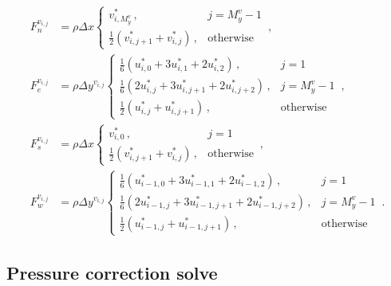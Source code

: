 \documentclass{article}
\begin{document}
\begin{subequations}
	\begin{align}
	F_n^{v_{i,j}} & = \rho \Delta x \begin{cases}
	v^*_{i, M_y^v}\,, & j = M_y^v - 1 \\
	\frac{1}{2} \left(v^*_{i, j+1} + v^*_{i,j}\right)\,, & \text{otherwise}
	\end{cases}\,, \\
	F_e^{v_{i,j}} & = \rho \Delta y^{v_{i,j}} \begin{cases}
	\frac{1}{6} \left( u^*_{i, 0} + 3 u^*_{i, 1} + 2 u^*_{i, 2} \right)\,, & j = 1 \\
	\frac{1}{6} \left( 2 u^*_{i, j} + 3 u^*_{i, j + 1} + 2 u^*_{i, j + 2} \right)\,, & j = M_y^v - 1 \\
	\frac{1}{2} \left( u^*_{i, j} + u^*_{i, j + 1} \right)\,, & \text{otherwise} 
	\end{cases}\,, \\
	F_s^{v_{i,j}} & = \rho \Delta x \begin{cases}
	v^*_{i, 0}\,, & j = 1 \\
	\frac{1}{2} \left(v^*_{i, j+ 1} + v^*_{i,j}\right)\,, & \text{otherwise}
	\end{cases}\,, \\
	F_w^{v_{i,j}} & = \rho \Delta y^{v_{i,j}} \begin{cases}
	\frac{1}{6} \left( u^*_{i - 1, 0} + 3 u^*_{i - 1, 1} + 2 u^*_{i - 1, 2} \right)\,, & j = 1 \\
	\frac{1}{6} \left( 2 u^*_{i - 1, j} + 3 u^*_{i - 1, j + 1} + 2 u^*_{i - 1, j + 2} \right)\,, & j = M_y^v - 1 \\
	\frac{1}{2} \left( u^*_{i - 1, j} + u^*_{i - 1, j + 1} \right)\,, & \text{otherwise} 
	\end{cases}\,.
	\end{align}
\end{subequations}

\subsection{Pressure correction solve}
\label{subsec:pc-solve}
\end{document}
